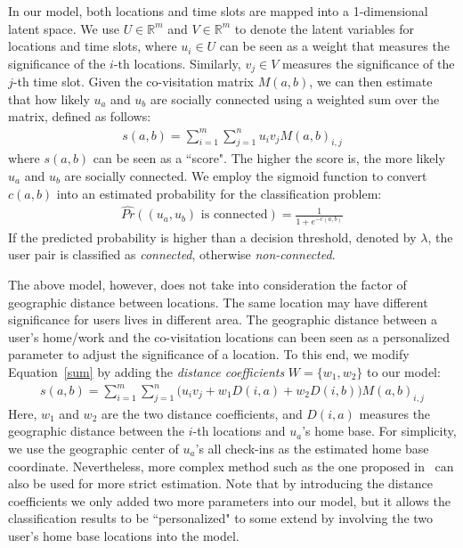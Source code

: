 In our model, both locations and time slots are mapped into a 1-dimensional latent space. We use $U \in \mathbb{R}^m$ and $V \in \mathbb{R}^m$ to denote the latent variables for locations and time slots, where $u_i \in U$ can be seen as a weight that measures the significance of the $i$-th locations. Similarly, $v_j \in V$ measures the significance of the $j$-th time slot. Given the co-visitation matrix $M(a,b)$, we can then estimate that how likely $u_a$ and $u_b$ are socially connected using a weighted sum over the matrix, defined as follows:
\begin{align}\label{sum}
s(a,b) = \sum_{i = 1} ^m \sum_{j=1}^n u_i v_j M(a,b)_{i,j}
\end{align}
where $s(a,b)$ can be seen as a ``score". The higher the score is, the more likely $u_a$ and $u_b$ are socially connected. We employ the sigmoid function to convert $c(a,b)$ into an estimated probability for the classification problem:
\begin{align}\label{sigmoid}
\hat{Pr}( (u_a, u_b)  \text{ is connected} ) = \frac{1}{1 + e^{-c(a,b)}}
\end{align}
If the predicted probability is higher than a decision threshold, denoted by $\lambda$, the user pair is classified as \textit{connected}, otherwise \textit{non-connected}.

The above model, however, does not take into consideration the factor of geographic distance between locations. The same location may have different significance for users lives in different area. The geographic distance between a user's home/work and the co-visitation locations can been seen as a personalized parameter to adjust the significance of a location. To this end, we modify Equation~\ref{sum} by adding the \textit{distance coefficients} $W = \{w_1, w_2\}$ to our model:
\begin{align}\label{sum2}
s(a,b) = \sum_{i = 1} ^m \sum_{j=1}^n \bigg( u_i v_j + w_1 D(i,a) + w_2 D(i,b) \bigg) M(a,b)_{i,j} 
\end{align}
Here, $w_1$ and $w_2$ are the two distance coefficients, and $D(i,a)$ measures the geographic distance between the $i$-th locations and $u_a$'s home base. For simplicity, we use the geographic center of $u_a$'s all check-ins as the estimated home base coordinate. Nevertheless, more complex method such as the one proposed in~\cite{cho2011friendship} can also be used for more strict estimation. Note that by introducing the distance coefficients we only added two more parameters into our model, but it allows the classification results to be ``personalized" to some extend by involving the two user's home base locations into the model.


